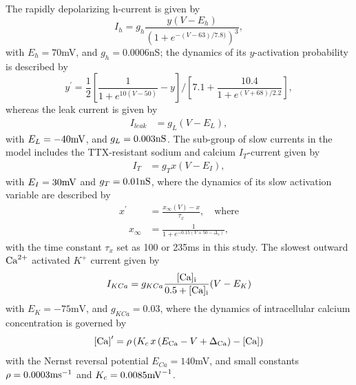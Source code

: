 \documentclass[nofootinbib,aip,amsmath,amssymb,reprint,twocolumn,10pt]{revtex4-2}
\begin{document}
The rapidly depolarizing h-current is given by 
\begin{equation}
I_{h}=g_{h} \frac{y (V-E_{h})}{(1+e^{-(V-63)/7.8)})^3}, 
\end{equation}
with $E_{h}=70$mV, and $g_h=0.0006$nS; the dynamics of its $y$-activation probability is described by 
 \begin{equation}
{y}^\prime = \frac{1}{2} \left [ \frac{1}{1+e^{10(V-50)}}-y \right ]/ \left [ 7.1+\frac{10.4}{1+e^{(V+68)/2.2}} \right ], 
\end{equation}	
whereas the leak current is given by 
\begin{align}
I_{leak} &=g_{L} (V-E_{L}), 
\end{align}
with $E_{L} =-40{\rm mV}$, and $g_{L}=0.003{\rm nS}$. The sub-group of slow currents in the model includes the TTX-resistant sodium and calcium $I_{T}$-current given by   \begin{align}
 I_{T} &= g_{T} x (V-E_{I}),
\end{align}
with $E_{I} =30{\rm mV}$ and $g_{T}=0.01{\rm nS}$, where the dynamics of its slow activation variable are described by  
 \begin{align}
{x}^\prime &= \frac{x_{\infty}(V)-x}{\tau_{x}}, \quad \mbox{where} \\ 
\quad x_{\infty} &= \frac{1}{1+e^{-0.15(V+50-\Delta_x)}},
\end{align}\label{eqttx} 
with the time constant $\tau_{x}$ set as 100 or 235ms in this study. The slowest outward ${\rm Ca}^{2+}$ activated $K^+$ current given by  
\begin{equation}
I_{KCa} =g_{KCa}\frac{[\rm Ca]_i}{0.5+[\rm Ca]_i}(V-E_{K})
 \label{IKCa}
\end{equation}
with  $E_{K}=-75\mbox{mV}$, and $g_{KCa}=0.03$, where the dynamics of intracellular calcium concentration is governed by 
\begin{equation}
{[\rm Ca]}^\prime  =  \rho \left ( K_{c}\, x\, (E_{\rm Ca}-V + \Delta_{\rm Ca})-[\rm Ca] \right  )  \label{eqCa}
\end{equation}
with the Nernst reversal potential  $E_{Ca}=140$mV, and small constants $\rho= 0.0003{\rm ms}^{-1}$ and  $K_c=0.0085{\rm mV}^{-1}$.
\end{document}
